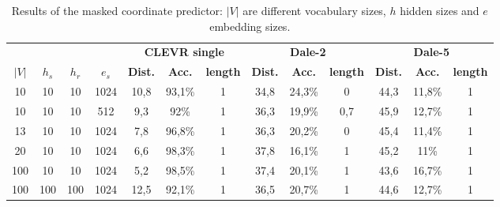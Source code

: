 \begin{table}[h]
    \centering
    \begin{tabular}{cccc|ccc|ccc|ccc}
        \toprule
              &         &         &         & \multicolumn{3}{c}{\textbf{CLEVR single}} & \multicolumn{3}{c}{\textbf{Dale-2}} & \multicolumn{3}{c}{\textbf{Dale-5}}                                                                                                       \\\cmidrule(lr){5-7}\cmidrule(lr){8-10}\cmidrule(lr){11-13}
        $|V|$ & $h_{s}$ & $h_{r}$ & $e_{s}$ & \textbf{Dist.}                            & \textbf{Acc.}                       & \textbf{length}                     & \textbf{Dist.} & \textbf{Acc.} & \textbf{length} & \textbf{Dist.} & \textbf{Acc.} & \textbf{length} \\\midrule
        {10}  & {10}    & {10}    & {1024}  & {10,8}                                    & {93,1\%}                            & {1}                                 & {34,8}         & {24,3\%}      & {0}             & {44,3}         & {11,8\%}      & {1}             \\
        {10}  & {10}    & {10}    & {512}   & {9,3}                                     & {92\%}                              & {1}                                 & {36,3}         & {19,9\%}      & {0,7}           & {45,9}         & {12,7\%}      & {1}             \\
        {13}  & {10}    & {10}    & {1024}  & {7,8}                                     & {96,8\%}                            & {1}                                 & {36,3}         & {20,2\%}      & {0}             & {45,4}         & {11,4\%}      & {1}             \\
        {20}  & {10}    & {10}    & {1024}  & {6,6}                                     & {98,3\%}                            & {1}                                 & {37,8}         & {16,1\%}      & {1}             & {45,2}         & {11\%}        & {1}             \\
        {100} & {10}    & {10}    & {1024}  & {5,2}                                     & {98,5\%}                            & {1}                                 & {37,4}         & {20,1\%}      & {1}             & {43,6}         & {16,7\%}      & {1}             \\
        {100} & {100}   & {100}   & {1024}  & {12,5}                                    & {92,1\%}                            & {1}                                 & {36,5}         & {20,7\%}      & {1}             & {44,6}         & {12,7\%}      & {1}             \\
        \bottomrule
    \end{tabular}
    \caption{Results of the masked coordinate predictor: $|V|$ are different vocabulary sizes, $h$ hidden sizes and $e$ embedding sizes.}
    \label{tab:results_masked_predictor_game}
\end{table}


